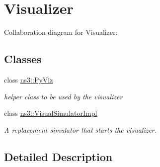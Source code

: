 \hypertarget{group__visualizer}{}\section{Visualizer}
\label{group__visualizer}
Collaboration diagram for Visualizer\+:
\subsection*{Classes}
\begin{DoxyCompactItemize}
\item 
class \hyperlink{classns3_1_1PyViz}{ns3\+::\+Py\+Viz}
\begin{DoxyCompactList}\small\item\em helper class to be used by the visualizer \end{DoxyCompactList}\item 
class \hyperlink{classns3_1_1VisualSimulatorImpl}{ns3\+::\+Visual\+Simulator\+Impl}
\begin{DoxyCompactList}\small\item\em A replacement simulator that starts the visualizer. \end{DoxyCompactList}\end{DoxyCompactItemize}


\subsection{Detailed Description}
